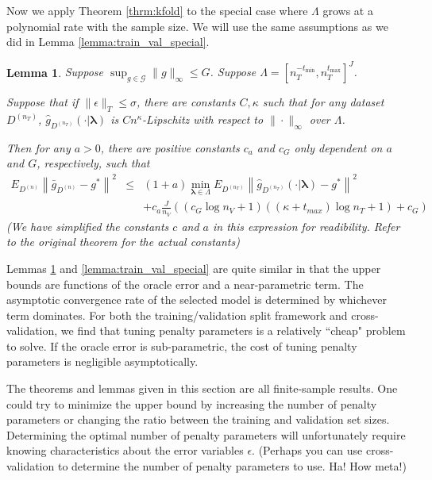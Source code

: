 \documentclass[12pt]{article}
\newtheorem{lemma}{Lemma}
\begin{document}
Now we apply Theorem \ref{thrm:kfold} to the special case where $\Lambda$ grows at a polynomial rate with the sample size. We will use the same assumptions as we did in Lemma \ref{lemma:train_val_special}.

\begin{lemma}
	\label{lemma:kfold_special}
Suppose $\sup_{g \in \mathcal{G}} \|g\|_\infty \le G$. Suppose $\Lambda = [n_T^{-t_{\min}}, n_T^{t_{\max}}]^J$.

Suppose that if $\|\epsilon\|_{T}\le \sigma$, there are constants $C,\kappa$ such that for any dataset $D^{(n_T)}$, $\hat{g}_{D^{(n_T)}}(\cdot | \boldsymbol \lambda)$ is $Cn^\kappa$-Lipschitz with respect to $\| \cdot \|_\infty$ over $\Lambda$.

Then for any $a > 0$, there are positive constants $c_a$ and $c_G$ only dependent on $a$ and $G$, respectively, such that
\begin{eqnarray}
E_{D^{(n)}} \left \| \bar{g}_{D^{(n)}} - g^* \right \|^2 
&\le&
(1+a) \min_{\boldsymbol{\lambda} \in \Lambda}  E_{D^{(n_T)}} \left \| \hat{g}_{D^{(n_T)}}(\cdot |\boldsymbol \lambda) - g^* \right \|^2 \\
&& + c_a \frac{J}{n_{V}}\left( \left(c_{G}\log n_{V}+1\right)\left(\left(\kappa+t_{max}\right)\log n_{T}+1\right)+c_{G}\right )
\end{eqnarray}
(We have simplified the constants $c$ and $a$ in this expression for readibility. Refer to the original theorem for the actual constants)
\end{lemma}
Lemmas \ref{lemma:kfold_special} and \ref{lemma:train_val_special} are quite similar in that the upper bounds are functions of the oracle error and a near-parametric term. The asymptotic convergence rate of the selected model is determined by whichever term dominates. For both the training/validation split framework and cross-validation, we find that tuning penalty parameters is a relatively ``cheap" problem to solve. If the oracle error is sub-parametric, the cost of tuning penalty parameters is negligible asymptotically.

The theorems and lemmas given in this section are all  finite-sample results. One could try to minimize the upper bound by increasing the number of penalty parameters or changing the ratio between the training and validation set sizes. Determining the optimal number of penalty parameters will unfortunately require knowing characteristics about the error variables $\epsilon$. (Perhaps you can use cross-validation to determine the number of penalty parameters to use. Ha! How meta!)
\end{document}
